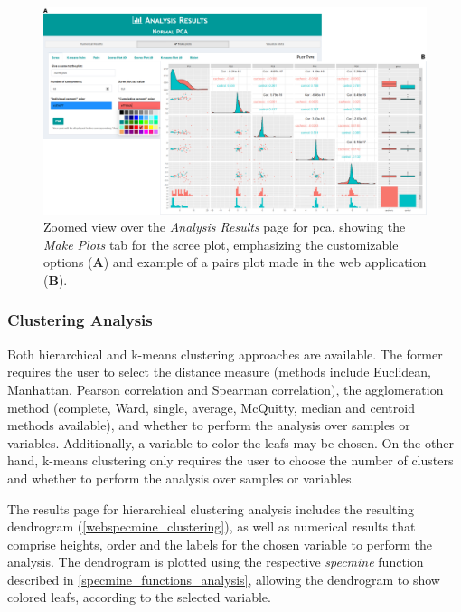 \begin{figure}[h]
	\centering
	\includegraphics[width=1\linewidth]{Imagens/webspecmine_pca}
	\caption{Zoomed view over the \textit{Analysis Results} page for \gls{pca}, showing the \textit{Make Plots} tab for the scree plot, emphasizing the customizable options (\textbf{A}) and example of a pairs plot made in the web application (\textbf{B}).}
	\label{webspecmine_pca}
\end{figure}


\subsubsection{Clustering Analysis}

Both hierarchical and k-means clustering approaches are available. The former requires the user to select the distance measure (methods include Euclidean, Manhattan, Pearson correlation and Spearman correlation), the agglomeration method (complete, Ward, single, average, McQuitty, median and centroid methods available), and whether to perform the analysis over samples or variables. Additionally, a variable to color the leafs may be chosen. On the other hand, k-means clustering only requires the user to choose the number of clusters and whether to perform the analysis over samples or variables.

The results page for hierarchical clustering analysis includes the resulting dendrogram (\autoref{webspecmine_clustering}), as well as numerical results that comprise heights, order and the labels for the chosen variable to perform the analysis. The dendrogram is plotted using the respective \textit{specmine} function described in \autoref{specmine_functions_analysis}, allowing the dendrogram to show colored leafs, according to the selected variable.

